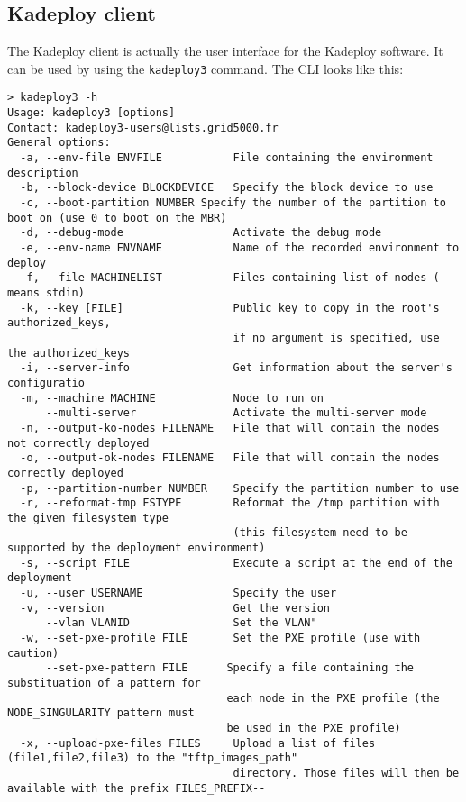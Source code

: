 \documentclass[a4wide,10pt,oneside]{book}
\begin{document}
\subsection{Kadeploy client}\label{sec:kadeploy_client}
The Kadeploy client is actually the user interface for the Kadeploy software. It can be used by using the \texttt{kadeploy3} command. The CLI looks like this:
\begin{small}
\begin{verbatim}
> kadeploy3 -h
Usage: kadeploy3 [options]
Contact: kadeploy3-users@lists.grid5000.fr
General options:
  -a, --env-file ENVFILE           File containing the environment description
  -b, --block-device BLOCKDEVICE   Specify the block device to use
  -c, --boot-partition NUMBER Specify the number of the partition to boot on (use 0 to boot on the MBR)
  -d, --debug-mode                 Activate the debug mode
  -e, --env-name ENVNAME           Name of the recorded environment to deploy
  -f, --file MACHINELIST           Files containing list of nodes (- means stdin)
  -k, --key [FILE]                 Public key to copy in the root's authorized_keys,
                                   if no argument is specified, use the authorized_keys
  -i, --server-info                Get information about the server's configuratio
  -m, --machine MACHINE            Node to run on
      --multi-server               Activate the multi-server mode
  -n, --output-ko-nodes FILENAME   File that will contain the nodes not correctly deployed
  -o, --output-ok-nodes FILENAME   File that will contain the nodes correctly deployed
  -p, --partition-number NUMBER    Specify the partition number to use
  -r, --reformat-tmp FSTYPE        Reformat the /tmp partition with the given filesystem type
                                   (this filesystem need to be supported by the deployment environment)
  -s, --script FILE                Execute a script at the end of the deployment
  -u, --user USERNAME              Specify the user
  -v, --version                    Get the version
      --vlan VLANID                Set the VLAN"
  -w, --set-pxe-profile FILE       Set the PXE profile (use with caution)
      --set-pxe-pattern FILE      Specify a file containing the substituation of a pattern for
                                  each node in the PXE profile (the NODE_SINGULARITY pattern must
                                  be used in the PXE profile)
  -x, --upload-pxe-files FILES     Upload a list of files (file1,file2,file3) to the "tftp_images_path"
                                   directory. Those files will then be available with the prefix FILES_PREFIX--

\end{verbatim}
\end{small}
\end{document}
